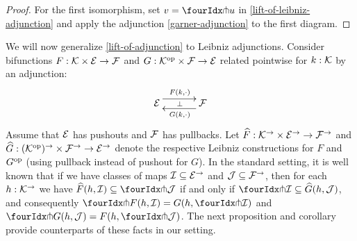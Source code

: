 \documentclass[reqno,10pt,a4paper,oneside]{amsart}
\begin{document}
\begin{proof}
For \eg the first isomorphism, set $v = \liftr{u}$ in \cref{lift-of-leibniz-adjunction} and apply the adjunction \eqref{garner-adjunction} to the first diagram.
\end{proof}

We will now generalize \cref{lift-of-adjunction} to Leibniz adjunctions.
Consider bifunctions $F : \cal{K} \times \cal{E} \to \cal{F}$ and $G : \cal{K}^{\op} \times \cal{F} \to \cal{E}$ related pointwise for $k : \cal{K}$ by an adjunction:
\[
\xymatrix@C+1em{
  \cal{E}
  \ar@<5pt>[r]^{F(k, \arghole)}
  \ar@{}[r]|{\bot}
&
  \cal{F}
  \ar@<5pt>[l]^{G(k, \arghole)}
}
\]
Assume that $\cal{E}$ has pushouts and $\cal{F}$ has pullbacks.
Let $\widehat{F} : \cal{K}^{\to} \times \cal{E}^{\to} \to \cal{F}^{\to}$ and $\widehat{G} : (\cal{K}^{\op})^{\to} \times \cal{F}^{\to} \to \cal{E}^{\to}$ denote the respective Leibniz constructions for $F$ and $G^{\op}$ (using pullback instead of pushout for $G$).
In the standard setting, it is well known that if  we have classes of maps $\cal{I} \subseteq \cal{E}^\to$ and $\cal{J} \subseteq \cal{F}^\to$, then for each $h : \cal{K}^{\to}$ we have $\widehat{F}(h, \cal{I}) \subseteq \liftl{\cal{J}}$ if and only if $\liftr{\cal{I}} \subseteq \widehat{G}(h, \cal{J})$, and consequently $\liftr{F(h, \cal{I})} = G(h, \liftr{\cal{I}})$ and $\liftl{G(h, \cal{J})} = F(h, \liftl{\cal{J}})$.
The next proposition and corollary provide counterparts of these facts in our setting.
\end{document}
